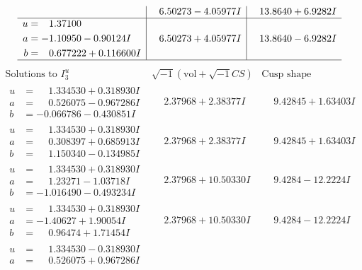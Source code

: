 \documentclass[1p]{elsarticle_modified}
\theoremstyle{definition}
\newcommand{\I}{\sqrt{-1}}
\begin{document}
$$\begin{array}{c|c|c}
 & \phantom{-}6.50273 - 4.05977 I & \phantom{-}13.8640 + 6.9282 I \\ \hline\begin{aligned}
u &= \phantom{-}1.37100\phantom{ +0.000000I} \\
a &= -1.10950 - 0.90124 I \\
b &= \phantom{-}0.677222 + 0.116600 I\end{aligned}
 & \phantom{-}6.50273 + 4.05977 I & \phantom{-}13.8640 - 6.9282 I\\
 \hline 
 \end{array}$$\newpage$$\begin{array}{c|c|c}  
\text{Solutions to }I^u_{3}& \I (\text{vol} + \sqrt{-1}CS) & \text{Cusp shape}\\
 \hline 
\begin{aligned}
u &= \phantom{-}1.334530 + 0.318930 I \\
a &= \phantom{-}0.526075 - 0.967286 I \\
b &= -0.066786 - 0.430851 I\end{aligned}
 & \phantom{-}2.37968 + 2.38377 I & \phantom{-}9.42845 + 1.63403 I \\ \hline\begin{aligned}
u &= \phantom{-}1.334530 + 0.318930 I \\
a &= \phantom{-}0.308397 + 0.685913 I \\
b &= \phantom{-}1.150340 - 0.134985 I\end{aligned}
 & \phantom{-}2.37968 + 2.38377 I & \phantom{-}9.42845 + 1.63403 I \\ \hline\begin{aligned}
u &= \phantom{-}1.334530 + 0.318930 I \\
a &= \phantom{-}1.23271 - 1.03718 I \\
b &= -1.016490 - 0.493234 I\end{aligned}
 & \phantom{-}2.37968 + 10.50330 I & \phantom{-}9.4284 - 12.2224 I \\ \hline\begin{aligned}
u &= \phantom{-}1.334530 + 0.318930 I \\
a &= -1.40627 + 1.90054 I \\
b &= \phantom{-}0.96474 + 1.71454 I\end{aligned}
 & \phantom{-}2.37968 + 10.50330 I & \phantom{-}9.4284 - 12.2224 I \\ \hline\begin{aligned}
u &= \phantom{-}1.334530 - 0.318930 I \\
a &= \phantom{-}0.526075 + 0.967286 I \\

\end{aligned}
\end{array}$$
\end{document}
